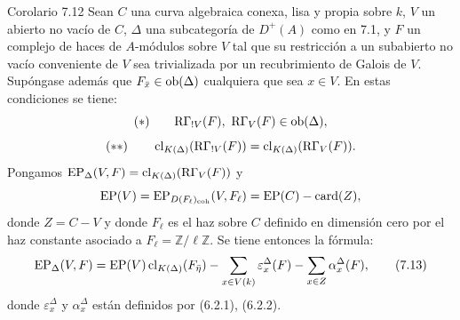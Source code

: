 \begin{statement}{Corolario 7.12}
Sean $C$ una curva algebraica conexa, lisa y propia sobre $k$, $V$ un abierto no vacío de $C$, $\Delta$ una subcategoría de $D^+(A)$ como en 7.1, y $F$ un complejo de haces de $A$-módulos sobre $V$ tal que su restricción a un subabierto no vacío conveniente de $V$ sea trivializada por un recubrimiento de Galois de $V$. Supóngase además que $F_{\bar x}\in\operatorname{ob}(\Delta)$ cualquiera que sea $x\in V$. En estas condiciones se tiene:
\[
(*)\qquad \mathrm R\Gamma_{!V}(F),\ \mathrm R\Gamma_V(F)\in\operatorname{ob}(\Delta),
\]
\[
(**)\qquad
\operatorname{cl}_{K(\Delta)}(\mathrm R\Gamma_{!V}(F))=\operatorname{cl}_{K(\Delta)}(\mathrm R\Gamma_V(F)).
\]
Pongamos $\operatorname{EP}_\Delta(V,F)=\operatorname{cl}_{K(\Delta)}(\mathrm R\Gamma_V(F))$ y
\[
\operatorname{EP}(V)=\operatorname{EP}_{D(F_\ell)_{\mathrm{coh}}}(V,F_\ell)=\operatorname{EP}(C)-\operatorname{card}(Z),
\]
donde $Z=C-V$ y donde $F_\ell$ es el haz sobre $C$ definido en dimensión cero por el haz constante asociado a $F_\ell=\mathbb Z/\ell\mathbb Z$. Se tiene entonces la fórmula:
\[
\operatorname{EP}_\Delta(V,F)
=
\operatorname{EP}(V)\operatorname{cl}_{K(\Delta)}(F_{\bar\eta})
-\sum_{x\in V(k)}\varepsilon_x^\Delta(F)
-\sum_{x\in Z}\alpha_x^\Delta(F),
\tag{7.13}
\]
donde $\varepsilon_x^\Delta$ y $\alpha_x^\Delta$ están definidos por (6.2.1), (6.2.2).
\end{statement}
